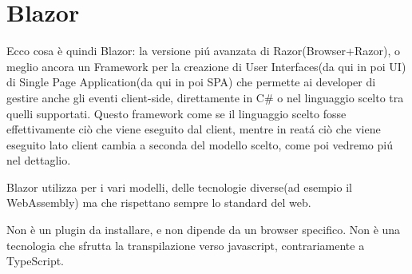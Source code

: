 \section{Blazor}
Ecco cosa \`e quindi Blazor: la versione pi\'u avanzata di Razor(Browser+Razor\cite{blazorWikiGitHub}), o meglio ancora un Framework per la creazione di User Interfaces(da qui in poi UI) di Single Page Application(da qui in poi SPA) che permette ai developer di gestire anche gli eventi client-side, direttamente in C\# o nel linguaggio scelto tra quelli supportati.
Questo framework come se il linguaggio scelto fosse effettivamente ci\`o che viene eseguito dal client, mentre in reat\'a ci\`o che viene eseguito lato client cambia a seconda del modello scelto, come poi vedremo pi\'u nel dettaglio.

Blazor utilizza per i vari modelli, delle tecnologie diverse(ad esempio il WebAssembly) ma che rispettano sempre lo standard del web.

Non \`e un plugin da installare, e non dipende da un browser specifico.
Non \`e una tecnologia che sfrutta la transpilazione verso javascript, contrariamente a TypeScript.